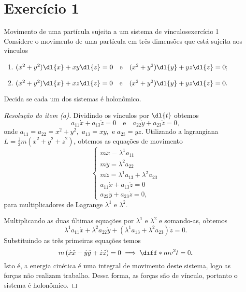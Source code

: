 \section*{Exercício 1}
\begin{exercício}{Movimento de uma partícula sujeita a um sistema de vínculos}{exercício 1}
    Considere o movimento de uma partícula em três dimensões que está sujeita aos vínculos
    \begin{enumerate}[label=(\alph*)]
        \item \((x^2 + y^2)\dl{x} + xy\dl{z} = 0\quad\text{e}\quad(x^2+y^2)\dl{y} + yz\dl{z} = 0;\)
        \item \((x^2 + y^2)\dl{x} + xz\dl{z} = 0\quad\text{e}\quad(x^2+y^2)\dl{y} + yz\dl{z} = 0.\)
    \end{enumerate}
    Decida se cada um dos sistemas é holonômico.
\end{exercício}
\begin{proof}[Resolução do item (a)]
    Dividindo os vínculos por \(\dl{t}\) obtemos
    \begin{equation*}
        a_{11}\dot{x} + a_{13} \dot{z} = 0\quad\text{e}\quad a_{22}\dot{y} + a_{23}\dot{z} = 0,
    \end{equation*}
    onde \(a_{11} = a_{22} = x^2+y^2,\) \(a_{13} = xy,\) e \(a_{23} = yz\). Utilizando a lagrangiana \(L = \frac12 m \left(\dot{x}^2 + \dot{y}^2 + \dot{z}^2\right)\), obtemos as equações de movimento
    \begin{equation*}
        \begin{cases}
            m\ddot{x} = \lambda^1a_{11}\\
            m\ddot{y} = \lambda^2a_{22}\\
            m\ddot{z} = \lambda^1a_{13} + \lambda^2a_{23}\\
            a_{11}\dot{x} + a_{13} \dot{z} = 0\\
            a_{22}\dot{y} + a_{23}\dot{z} = 0,
        \end{cases}
    \end{equation*}
    para multiplicadores de Lagrange \(\lambda^1\) e \(\lambda^2\).

    Multiplicando as duas últimas equações por \(\lambda^1\) e \(\lambda^2\) e somando-as, obtemos
    \begin{equation*}
        \lambda^1 a_{11} \dot{x} + \lambda^2 a_{22} \dot{y} + \left(\lambda^1 a_{13} + \lambda^2 a_{23}\right)\dot{z} = 0.
    \end{equation*}
    Substituindo as três primeiras equações temos
    \begin{equation*}
        m\left(\dot{x}\ddot{x} + \dot{y}\ddot{y} + \dot{z}\ddot{z}\right) = 0 \implies \diff*{mv^2}{t} = 0.
    \end{equation*}
    Isto é, a energia cinética é uma integral de movimento deste sistema, logo as forças não realizam trabalho. Dessa forma, as forças são de vínculo, portanto o sistema é holonômico.
\end{proof}
